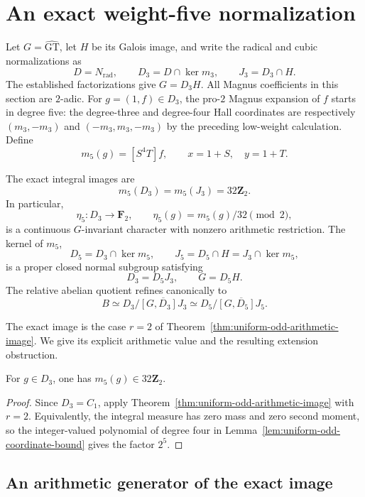 \section{An exact weight-five normalization}
\label{sec:weight-five-normalization}

Let $G=\widehat{\mathrm{GT}}$, let $H$ be its Galois image, and write
the radical and cubic normalizations as
\[
 D=N_{\mathrm{rad}},\qquad
 D_3=D\cap\ker m_3,\qquad J_3=D_3\cap H.
\]
The established factorizations give $G=D_3H$.  All Magnus coefficients
in this section are $2$-adic.  For $g=(1,f)\in D_3$, the pro-$2$
Magnus expansion of $f$ starts in degree five: the degree-three and
degree-four Hall coordinates are respectively
$(m_3,-m_3)$ and $(-m_3,m_3,-m_3)$ by the preceding low-weight
calculation.  Define
\[
 m_5(g)=[S^4T]f,\qquad x=1+S,\quad y=1+T.
\]

\begin{theorem}\label{thm:weight-five-exact-image}
The exact integral images are
\[
 m_5(D_3)=m_5(J_3)=32\mathbf Z_2.
\]
In particular,
\[
 \eta_5:D_3\longrightarrow\mathbf F_2,
 \qquad \eta_5(g)=m_5(g)/32\pmod2,
\]
is a continuous $G$-invariant character with nonzero arithmetic
restriction.  The kernel of $m_5$,
\[
 D_5=D_3\cap\ker m_5,
 \qquad J_5=D_5\cap H=J_3\cap\ker m_5,
\]
is a proper closed normal subgroup satisfying
\[
 D_3=D_5J_3,\qquad G=D_5H.
\]
The relative abelian quotient refines canonically to
\[
 B\simeq D_3/\overline{[G,D_3]J_3}
       \simeq D_5/\overline{[G,D_5]J_5}.
\]
\end{theorem}

The exact image is the case $r=2$ of
Theorem~\ref{thm:uniform-odd-arithmetic-image}. We give its explicit
arithmetic value and the resulting extension obstruction.

\begin{proposition}\label{prop:weight-five-upper-bound}
For $g\in D_3$, one has $m_5(g)\in32\mathbf Z_2$.
\end{proposition}

\begin{proof}
Since $D_3=C_1$, apply Theorem~\ref{thm:uniform-odd-arithmetic-image}
with $r=2$. Equivalently, the integral measure has zero mass and zero
second moment, so the integer-valued polynomial of degree four in
Lemma~\ref{lem:uniform-odd-coordinate-bound} gives the factor $2^5$.
\end{proof}

\subsection{An arithmetic generator of the exact image}

